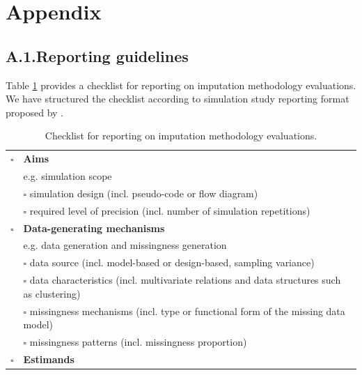 \documentclass[bimj,fleqn]{w-art}
\begin{document}
\newpage

\section*{Appendix}

\subsection*{A.1.\enspace Reporting guidelines}

Table \ref{table:check} provides a checklist for reporting on imputation methodology evaluations. We have structured the checklist according to simulation study reporting format proposed by \citet{morr18}.  

\begin{table}[ht!]
\caption{Checklist for reporting on imputation methodology evaluations.}
\label{table:check}
\begin{tabular}{ll}
\hline
$\square$ & \textbf{Aims}                                                                                  \\
  & e.g. simulation scope                                                                          \\ \cline{2-2} 
  & $\square$ simulation design (incl. pseudo-code or flow diagram)                                        \\
  & $\square$ required level of precision (incl. number of simulation   repetitions)                       \\ \hline
$\square$ & \textbf{Data-generating mechanisms}                                                            \\
  & e.g. data generation and missingness generation                                                \\ \cline{2-2} 
  & $\square$ data source (incl. model-based or design-based, sampling   variance)                         \\
  & $\square$ data characteristics (incl. multivariate relations and data   structures such as clustering) \\
  & $\square$ missingness mechanisms (incl. type or functional form of the   missing data model)           \\
  & $\square$ missingness patterns (incl. missingness proportion)                                          \\ \hline
$\square$ & \textbf{Estimands}                                                                             \\

\end{tabular}
\end{table}
\end{document}
